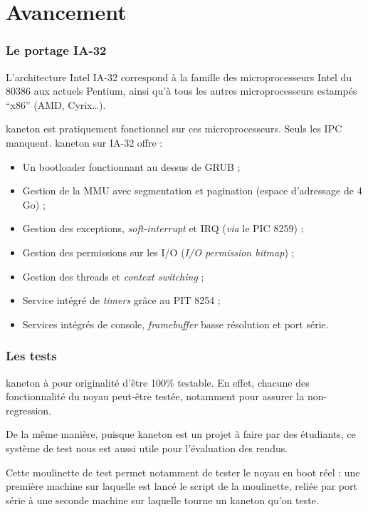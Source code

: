 %
%

\section{Avancement}


\begin{frame}
  \frametitle{Le portage IA-32}

  L'architecture Intel IA-32 correspond \`{a} la famille des
  microprocesseurs Intel du 80386 aux actuels Pentium, ainsi qu'\`{a} tous
  les autres microprocesseurs estamp\'{e}s ``x86'' (AMD, Cyrix\ldots).

  \-

  kaneton est pratiquement fonctionnel sur ces microprocesseurs. Seuls
  les IPC manquent. kaneton sur IA-32 offre :

  \begin{itemize}
  \item
    Un bootloader fonctionnant au dessus de GRUB ;
  \item
    Gestion de la MMU avec segmentation et pagination (espace d'adressage de 4 Go) ;
  \item
    Gestion des exceptions, \emph{soft-interrupt} et IRQ (\emph{via} le PIC 8259) ;
  \item
    Gestion des permissions sur les I/O (\emph{I/O permission bitmap}) ;
  \item
    Gestion des threads et \emph{context switching} ;
  \item
    Service int\'{e}gr\'{e} de \emph{timers} gr\^{a}ce au PIT 8254 ;
  \item
    Services int\'{e}gr\'{e}s de console, \emph{framebuffer} basse r\'{e}solution et port s\'{e}rie.
  \end{itemize}

\end{frame}


\begin{frame}
  \frametitle{Les tests}

  kaneton \`{a} pour originalit\'{e} d'\^{e}tre 100\% testable. En effet, chacune
  des fonctionnalit\'{e} du noyau peut-\^{e}tre test\'{e}e, notamment pour assurer
  la non-regression.

  \-

  De la m\^{e}me mani\`{e}re, puisque kaneton est un projet \`{a} faire par des
  \'{e}tudiants, ce syst\`{e}me de test nous est aussi utile pour l'\'{e}valuation
  des rendus.

  \-

  Cette moulinette de test permet notamment de tester le noyau en boot
  r\'{e}el : une premi\`{e}re machine sur laquelle est lanc\'{e} le script de la
  moulinette, reli\'{e}e par port s\'{e}rie \`{a} une seconde machine sur laquelle
  tourne un kaneton qu'on teste.

\end{frame}

